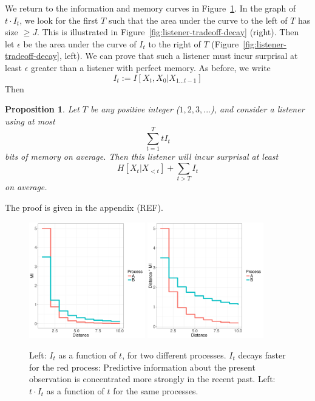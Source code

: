 \documentclass[11pt,letterpaper]{article}
\newcounter{theorem}
\newtheorem{proposition}[theorem]{Proposition}
\begin{document}
We return to the information and memory curves in Figure~\ref{fig:basic}.
In the graph of $t \cdot I_t$, we look for the first $T$ such that the area under the curve to the left of $T$ has size $\geq J$.
This is illustrated in Figure~\ref{fig:listener-tradeoff-decay} (right).
Then let $\epsilon$ be the area under the curve of $I_t$ to the right of $T$ (Figure~\ref{fig:listener-tradeoff-decay}, left).
We can prove that such a listener must incur surprisal at least $\epsilon$ greater than a listener with perfect memory.
As before, we write $$I_t := I[X_t, X_0 | X_{1\dots t-1}]$$
Then


\begin{proposition}\label{prop:suboptimal}
	Let $T$ be any positive integer ($1, 2, 3, ...$), and consider a listener using at most
	\begin{equation}\label{eq:memory}
		\sum_{t=1}^T t I_t
	\end{equation}
bits of memory on average.
Then this listener will incur surprisal at least
	$$H[X_t|X_{<t}] + \sum_{t > T} I_t$$
	on average.
\end{proposition}
The proof is given in the appendix (REF).



\begin{figure}
\includegraphics[width=0.45\textwidth]{toy/decay.pdf}
\includegraphics[width=0.45\textwidth]{toy/memory.pdf}
%
	\caption{Left: $I_t$ as a function of $t$, for two different processes. $I_t$ decays faster for the red process: Predictive information about the present observation is concentrated more strongly in the recent past. Left: $t \cdot I_t$ as a function of $t$ for the same processes. }\label{fig:basic}
\end{figure}
\end{document}
